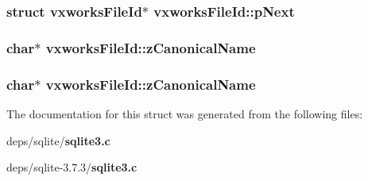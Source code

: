 \subsubsection{\setlength{\rightskip}{0pt plus 5cm}struct \bf{vxworks\-File\-Id}$\ast$ \bf{vxworks\-File\-Id::p\-Next}}\label{structvxworksFileId_de58ed00acaed258779a5f22c97eda29}


\subsubsection{\setlength{\rightskip}{0pt plus 5cm}char$\ast$ \bf{vxworks\-File\-Id::z\-Canonical\-Name}}\label{structvxworksFileId_09b0938bfdf9568a70f6dc33b49704b4}


\subsubsection{\setlength{\rightskip}{0pt plus 5cm}char$\ast$ \bf{vxworks\-File\-Id::z\-Canonical\-Name}}\label{structvxworksFileId_09b0938bfdf9568a70f6dc33b49704b4}




The documentation for this struct was generated from the following files:\begin{CompactItemize}
\item 
deps/sqlite/\bf{sqlite3.c}\item 
deps/sqlite-3.7.3/\bf{sqlite3.c}\end{CompactItemize}
